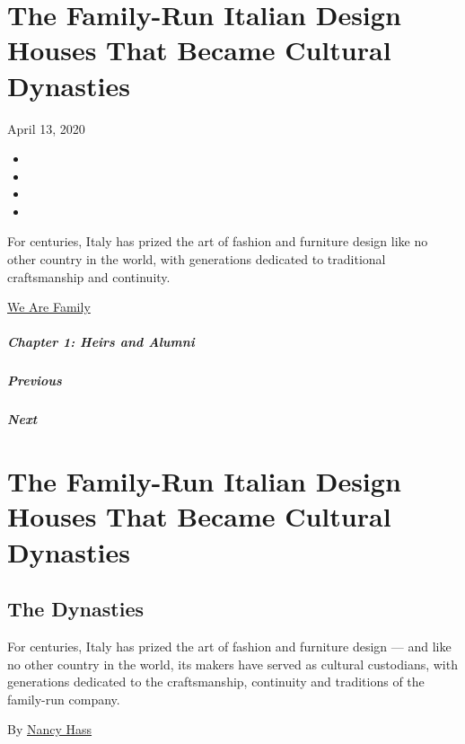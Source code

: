 \hypertarget{the-family-run-italian-design-houses-that-became-cultural-dynasties}{%
\section{The Family-Run Italian Design Houses That Became Cultural
Dynasties}\label{the-family-run-italian-design-houses-that-became-cultural-dynasties}}

April 13, 2020

\begin{itemize}
\item
\item
\item
\item
\end{itemize}

For centuries, Italy has prized the art of fashion and furniture design
like no other country in the world, with generations dedicated to
traditional craftsmanship and continuity.

\href{https://www.nytimes.com/interactive/2020/04/13/t-magazine/culture-issue-2020.html}{We
Are Family}

\hypertarget{chapter-1-heirs-and-alumni}{%
\subparagraph{Chapter 1: Heirs and
Alumni}\label{chapter-1-heirs-and-alumni}}

\hypertarget{previous}{%
\subparagraph{Previous}\label{previous}}

\hypertarget{next}{%
\subparagraph{Next}\label{next}}

\hypertarget{the-family-run-italian-design-houses-that-became-cultural-dynasties-1}{%
\section{The Family-Run Italian Design Houses That Became Cultural
Dynasties}\label{the-family-run-italian-design-houses-that-became-cultural-dynasties-1}}

\hypertarget{the-dynasties}{%
\subsection{The Dynasties}\label{the-dynasties}}

For centuries, Italy has prized the art of fashion and furniture design
--- and like no other country in the world, its makers have served as
cultural custodians, with generations dedicated to the craftsmanship,
continuity and traditions of the family-run company.

By \href{https://www.nytimes.com/by/nancy-hass}{Nancy Hass}

